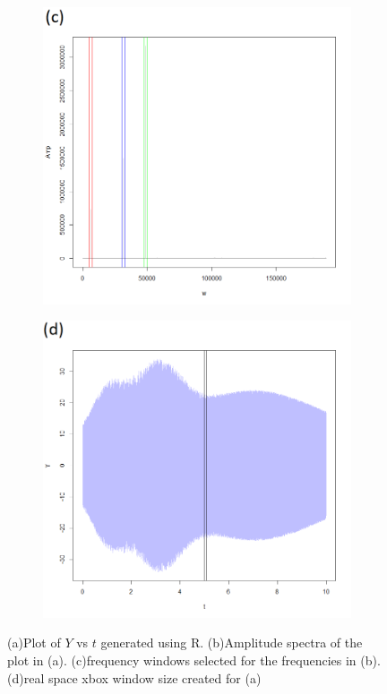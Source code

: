 \documentclass{article}
\begin{document}
\begin{figure}[h]
\begin{subfigure}[t]{0.49\textwidth}
 		\label{F1b}
 	\end{subfigure}
 	\vfill
	\begin{subfigure}[t]{0.49\textwidth}
	\centering
	\includegraphics[width=\linewidth]{signal_build1_AmpSpec_Windows.png}
	\label{F1c}
\end{subfigure}
\hfill
\begin{subfigure}[t]{0.49\textwidth}
	\centering
	\includegraphics[width=\linewidth]{signal_build1_xbox_size.png}
	\label{F1d}
\end{subfigure}
 	\caption{(a)Plot of $Y$ vs $t$ generated using R. (b)Amplitude spectra of the plot in (a). (c)frequency windows selected for the frequencies in (b). (d)real space xbox window size created for (a)}\label{F1}
 \end{figure}
\end{document}
